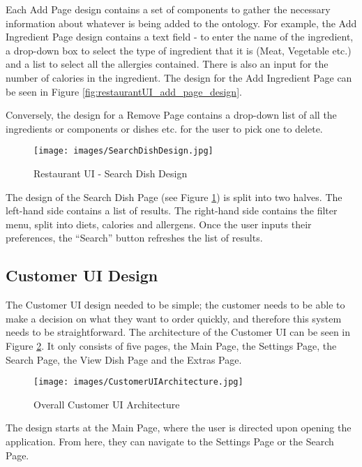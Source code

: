 Each Add Page design contains a set of components to gather the necessary information about whatever is being added to the ontology. For example, the Add Ingredient Page design contains a text field - to enter the name of the ingredient, a drop-down box to select the type of ingredient that it is (Meat, Vegetable etc.) and a list to select all the allergies contained. There is also an input for the number of calories in the ingredient. The design for the Add Ingredient Page can be seen in Figure \ref{fig:restaurantUI_add_page_design}.

Conversely, the design for a Remove Page contains a drop-down list of all the ingredients or components or dishes etc. for the user to pick one to delete.

\begin{figure}[h]
    \centering
    \captionsetup{justification=centering}
    \texttt{[image: images/SearchDishDesign.jpg]}
    \caption{Restaurant UI - Search Dish Design}
    \label{fig:restaurantUI_query_page_design}
\end{figure}

The design of the Search Dish Page (see Figure \ref{fig:restaurantUI_query_page_design}) is split into two halves. The left-hand side contains a list of results. The right-hand side contains the filter menu, split into diets, calories and allergens. Once the user inputs their preferences, the ``Search'' button refreshes the list of results.

\subsection{Customer UI Design}

The Customer UI design needed to be simple; the customer needs to be able to make a decision on what they want to order quickly, and therefore this system needs to be straightforward. The architecture of the Customer UI can be seen in Figure \ref{fig:customerUI_architecture}. It only consists of five pages, the Main Page, the Settings Page, the Search Page, the View Dish Page and the Extras Page.

\begin{figure}[h]
    \centering
    \captionsetup{justification=centering}
    \texttt{[image: images/CustomerUIArchitecture.jpg]}
    \caption{Overall Customer UI Architecture}
    \label{fig:customerUI_architecture}
\end{figure}

The design starts at the Main Page, where the user is directed upon opening the application. From here, they can navigate to the Settings Page or the Search Page. 

